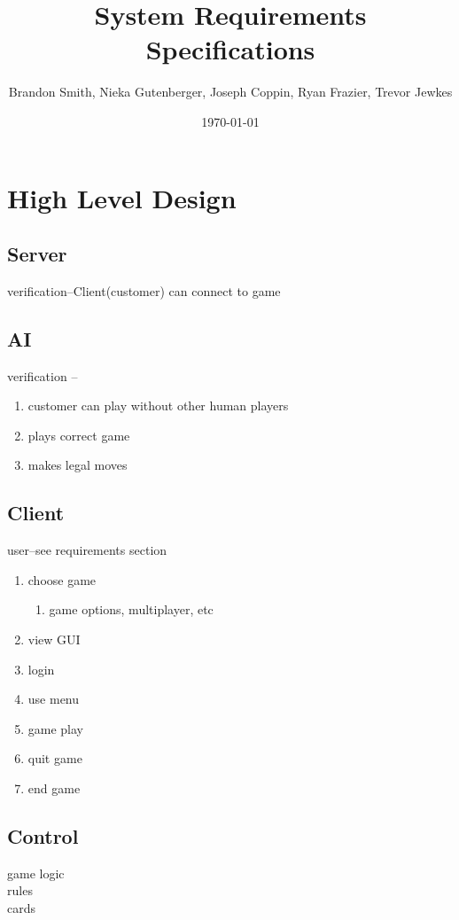 \documentclass[11pt, titlepage]{article}
\author{Brandon Smith, Nieka Gutenberger, Joseph Coppin, Ryan Frazier, Trevor Jewkes}
\title{System Requirements Specifications}
\date{\today}
\begin{document}
	\maketitle
	\setcounter{tocdepth}{1}
	\section{High Level Design}
	
		\subsection{Server}
		verification--Client(customer) can connect to game
		\subsection{AI}
		verification -- 
			\begin{enumerate}
				\item customer can play without other human players
				\item plays correct game
				\item makes legal moves
			\end{enumerate}
			
		\subsection{Client}
			user--see requirements section
			\begin{enumerate}
				\item  choose game
				\begin{enumerate}
					\item game options, multiplayer, etc
				\end{enumerate}
				\item view GUI
				\item login
				\item use menu
				\item game play
				\item quit game
				\item end game
			\end{enumerate}

			
		\subsection{Control}
			game logic \\
			rules\\
			cards\\
\end{document}
